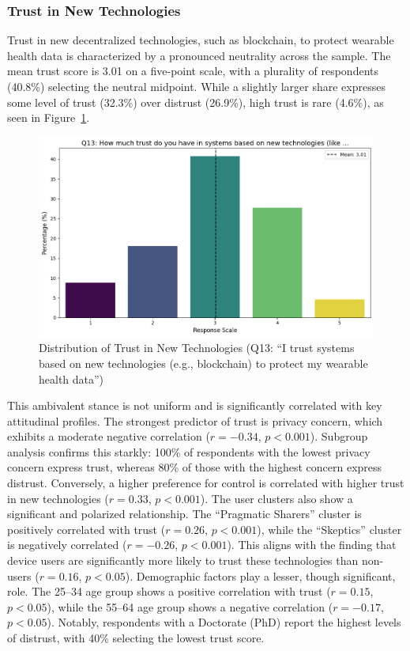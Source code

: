 	\subsubsection{Trust in New Technologies}
		Trust in new decentralized technologies, such as blockchain, to protect wearable health data is characterized by a pronounced neutrality across the sample. The mean trust score is 3.01 on a five-point scale, with a plurality of respondents (40.8\%) selecting the neutral midpoint. While a slightly larger share expresses some level of trust (32.3\%) over distrust (26.9\%), high trust is rare (4.6\%), as seen in Figure~\ref{fig:Q13_trust_newtech}.
		\begin{figure}[ht]\centering
			\includegraphics[width=0.7\linewidth]{figures/questions/Q13_likert.png}
			\caption{Distribution of Trust in New Technologies (Q13: ``I trust systems based on new technologies (e.g., blockchain) to protect my wearable health data'')}
			\label{fig:Q13_trust_newtech}
		\end{figure}
		This ambivalent stance is not uniform and is significantly correlated with key attitudinal profiles. The strongest predictor of trust is privacy concern, which exhibits a moderate negative correlation ($r = -0.34$, $p < 0.001$). Subgroup analysis confirms this starkly: 100\% of respondents with the lowest privacy concern express trust, whereas 80\% of those with the highest concern express distrust. Conversely, a higher preference for control is correlated with higher trust in new technologies ($r = 0.33$, $p < 0.001$).
		The user clusters also show a significant and polarized relationship. The ``Pragmatic Sharers'' cluster is positively correlated with trust ($r = 0.26$, $p < 0.001$), while the ``Skeptics'' cluster is negatively correlated ($r = -0.26$, $p < 0.001$). This aligns with the finding that device users are significantly more likely to trust these technologies than non-users ($r = 0.16$, $p < 0.05$).
		Demographic factors play a lesser, though significant, role. The 25--34 age group shows a positive correlation with trust ($r = 0.15$, $p < 0.05$), while the 55--64 age group shows a negative correlation ($r = -0.17$, $p < 0.05$). Notably, respondents with a Doctorate (PhD) report the highest levels of distrust, with 40\% selecting the lowest trust score.
